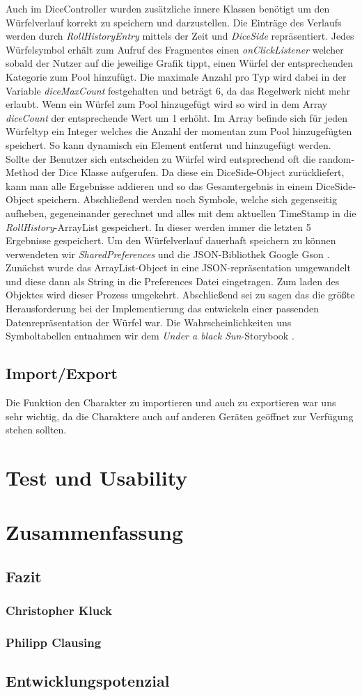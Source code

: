 Auch im DiceController wurden zusätzliche innere Klassen benötigt um den Würfelverlauf korrekt zu speichern und darzustellen. Die Einträge des Verlaufs werden durch \textit{RollHistoryEntry} mittels der Zeit und \textit{DiceSide} repräsentiert. Jedes Würfelsymbol erhält zum Aufruf des Fragmentes einen \textit{onClickListener} welcher sobald der Nutzer auf die jeweilige Grafik tippt, einen Würfel der entsprechenden Kategorie zum \grqq Pool\grqq{} hinzufügt. Die maximale Anzahl pro Typ wird dabei in der Variable \textit{diceMaxCount} festgehalten und beträgt 6, da das Regelwerk nicht mehr erlaubt. Wenn ein Würfel zum Pool hinzugefügt wird so wird in dem Array \textit{diceCount} der entsprechende Wert um 1 erhöht. Im Array befinde sich für jeden Würfeltyp ein Integer welches die Anzahl der momentan zum Pool hinzugefügten speichert. So kann dynamisch ein Element entfernt und hinzugefügt werden. Sollte der Benutzer sich entscheiden zu Würfel wird entsprechend oft die random-Method der Dice Klasse aufgerufen. Da diese ein DiceSide-Object zurückliefert, kann man alle Ergebnisse addieren und so das Gesamtergebnis in einem DiceSide-Object speichern. Abschließend werden noch Symbole, welche sich gegenseitig aufheben, gegeneinander gerechnet und alles mit dem aktuellen TimeStamp in die \textit{RollHistory}-ArrayList gespeichert. In dieser werden immer die letzten 5 Ergebnisse gespeichert. Um den Würfelverlauf dauerhaft speichern zu können verwendeten wir \textit{SharedPreferences} und die JSON-Bibliothek Google Gson \cite{gson}. Zunächst wurde das ArrayList-Object in eine JSON-repräsentation umgewandelt und diese dann als String in die Preferences Datei eingetragen. Zum laden des Objektes wird dieser Prozess umgekehrt. Abschließend sei zu sagen das die größte Herausforderung bei der Implementierung das entwickeln einer passenden Datenrepräsentation der Würfel war. Die Wahrscheinlichkeiten uns Symboltabellen entnahmen wir dem \textit{Under a black Sun}-Storybook \cite{adventurebook}.

\subsection{Import/Export}

Die Funktion den Charakter zu importieren und auch zu exportieren war uns sehr wichtig, da die Charaktere auch auf anderen Geräten geöffnet zur Verfügung stehen sollten.

\section{Test und Usability}

\section{Zusammenfassung}
\subsection{Fazit}
\subsubsection{Christopher Kluck}
\subsubsection{Philipp Clausing}
\subsection{Entwicklungspotenzial}
